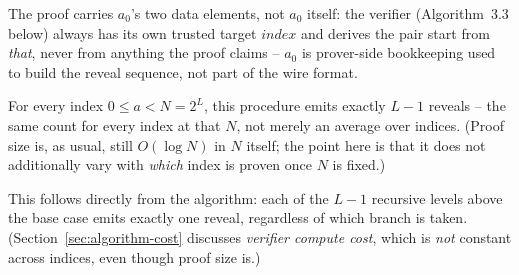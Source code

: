 The proof carries $a_0$'s two data elements, not $a_0$ itself: the
verifier (Algorithm~3.3 below) always has its own trusted target
$\mathit{index}$ and derives the pair start from \emph{that}, never from
anything the proof claims -- $a_0$ is prover-side bookkeeping used to
build the reveal sequence, not part of the wire format.

\begin{lemma}
For every index $0 \le a < N = 2^L$, this procedure emits exactly $L-1$
reveals -- the same count for every index at that $N$, not merely an
average over indices. (Proof size is, as usual, still $O(\log N)$ in $N$
itself; the point here is that it does not additionally vary with
\emph{which} index is proven once $N$ is fixed.)
\end{lemma}

This follows directly from the algorithm: each of the $L-1$ recursive levels
above the base case emits exactly one reveal, regardless of which branch is
taken. (Section~\ref{sec:algorithm-cost} discusses \emph{verifier compute
cost}, which is \emph{not} constant across indices, even though proof size
is.)

